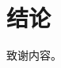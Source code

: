 \documentclass{cjc}
\begin{document}

\section{结论}


\begin{acknowledgments}
致谢内容。
\end{acknowledgments}





\makebiographies

\end{document}
